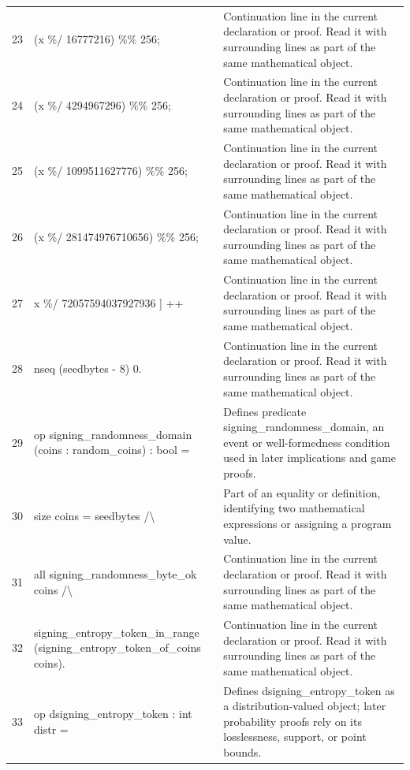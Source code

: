 \documentclass[10pt]{article}
\begin{document}
\begin{longtable}{r L{0.53\textwidth} L{0.37\textwidth}}
23 & {\ttfamily\scriptsize     (x \%/ 16777216) \%\% 256;} & Continuation line in the current declaration or proof.  Read it with surrounding lines as part of the same mathematical object. \\
24 & {\ttfamily\scriptsize     (x \%/ 4294967296) \%\% 256;} & Continuation line in the current declaration or proof.  Read it with surrounding lines as part of the same mathematical object. \\
25 & {\ttfamily\scriptsize     (x \%/ 1099511627776) \%\% 256;} & Continuation line in the current declaration or proof.  Read it with surrounding lines as part of the same mathematical object. \\
26 & {\ttfamily\scriptsize     (x \%/ 281474976710656) \%\% 256;} & Continuation line in the current declaration or proof.  Read it with surrounding lines as part of the same mathematical object. \\
27 & {\ttfamily\scriptsize     x \%/ 72057594037927936 ] ++} & Continuation line in the current declaration or proof.  Read it with surrounding lines as part of the same mathematical object. \\
28 & {\ttfamily\scriptsize   nseq (seedbytes - 8) 0.} & Continuation line in the current declaration or proof.  Read it with surrounding lines as part of the same mathematical object. \\
29 & {\ttfamily\scriptsize op signing\_randomness\_domain (coins : random\_coins) : bool =} & Defines predicate signing\_randomness\_domain, an event or well-formedness condition used in later implications and game proofs. \\
30 & {\ttfamily\scriptsize   size coins = seedbytes /\textbackslash{}} & Part of an equality or definition, identifying two mathematical expressions or assigning a program value. \\
31 & {\ttfamily\scriptsize   all signing\_randomness\_byte\_ok coins /\textbackslash{}} & Continuation line in the current declaration or proof.  Read it with surrounding lines as part of the same mathematical object. \\
32 & {\ttfamily\scriptsize   signing\_entropy\_token\_in\_range (signing\_entropy\_token\_of\_coins coins).} & Continuation line in the current declaration or proof.  Read it with surrounding lines as part of the same mathematical object. \\
33 & {\ttfamily\scriptsize op dsigning\_entropy\_token : int distr =} & Defines dsigning\_entropy\_token as a distribution-valued object; later probability proofs rely on its losslessness, support, or point bounds. \\

\end{longtable}
\end{document}
